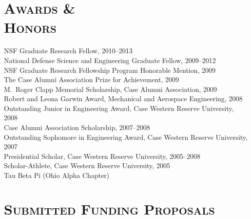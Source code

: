 \documentclass[margin,line,11pt]{res}
\begin{document}
\begin{resume}
\section{\textsc{Awards \& \\Honors}}
NSF Graduate Research Fellow, 2010--2013 \\
National Defense Science and Engineering Graduate Fellow, 2009--2012 \\
NSF Graduate Research Fellowship Program Honorable Mention, 2009 \\
The Case Alumni Association Prize for Achievement, 2009 \\
M.\ Roger Clapp Memorial Scholarship, Case Alumni Association, 2009 \\
Robert and Leona Garwin Award, Mechanical and Aerospace Engineering, 2008 \\
Outstanding Junior in Engineering Award, Case Western Reserve University, 2008 \\
Case Alumni Association Scholarship, 2007--2008 \\
Outstanding Sophomore in Engineering Award, Case Western Reserve University, 2007 \\
Presidential Scholar, Case Western Reserve University, 2005--2008 \\
Scholar-Athlete, Case Western Reserve University, 2005 \\
Tau Beta Pi (Ohio Alpha Chapter)

%

\section{\textsc{Submitted Funding Proposals}}


\end{resume}
\end{document}
